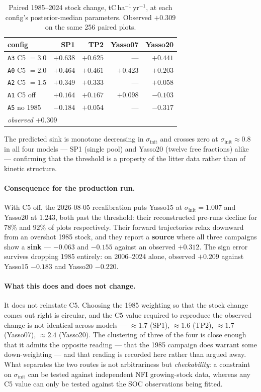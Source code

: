 \documentclass[11pt]{article}
\newcommand{\sinit}{\sigma_{\mathrm{init}}}
\begin{document}
\begin{table}[H]\centering\small
\caption{Paired 1985--2024 stock change, tC\,ha$^{-1}$\,yr$^{-1}$, at each config's
posterior-median parameters. Observed $+0.309$ on the same 256 paired plots.}
\begin{tabular}{lrrrr}
\toprule
config & SP1 & TP2 & Yasso07 & Yasso20\\
\midrule
\texttt{A3} C5 $=3.0$   & $+0.638$ & $+0.625$ & ---      & $+0.441$\\
\texttt{A0} C5 $=2.0$   & $+0.464$ & $+0.461$ & $+0.423$ & $+0.203$\\
\texttt{A2} C5 $=1.5$   & $+0.349$ & $+0.333$ & ---      & $+0.058$\\
\texttt{A1} C5 off      & $+0.164$ & $+0.167$ & $+0.098$ & $\mathbf{-0.103}$\\
\texttt{A5} no 1985     & $\mathbf{-0.184}$ & $+0.054$ & --- & $\mathbf{-0.317}$\\
\midrule
\multicolumn{5}{l}{\emph{observed} $+0.309$}\\
\bottomrule
\end{tabular}
\end{table}

\noindent The predicted sink is monotone decreasing in $\sinit$ and crosses zero at
$\sinit \approx 0.8$ in all four models --- SP1 (single pool) and Yasso20 (twelve free
fractions) alike --- confirming that the threshold is a property of the litter data rather than
of kinetic structure.

\paragraph{Consequence for the production run.} With C5 off, the 2026-08-05 recalibration puts
Yasso15 at $\sinit = 1.007$ and Yasso20 at $1.243$, both past the threshold: their reconstructed
pre-runs decline for $78\%$ and $92\%$ of plots respectively. Their forward trajectories relax
downward from an overshot 1985 stock, and they report a \textbf{source} where all three
campaigns show a \textbf{sink} --- $-0.063$ and $-0.155$ against an observed $+0.312$. The sign
error survives dropping 1985 entirely: on 2006--2024 alone, observed $+0.209$ against Yasso15
$-0.183$ and Yasso20 $-0.220$.

\paragraph{What this does and does not change.} It does not reinstate C5. Choosing the 1985
weighting so that the stock change comes out right is circular, and the C5 value required to
reproduce the observed change is not identical across models --- $\approx 1.7$ (SP1),
$\approx 1.6$ (TP2), $\approx 1.7$ (Yasso07), $\approx 2.4$ (Yasso20). The clustering of three
of the four is close enough that it admits the opposite reading --- that the 1985 campaign does
warrant some down-weighting --- and that reading is recorded here rather than argued away. What
separates the two routes is not arbitrariness but \emph{checkability}: a constraint on $\sinit$
can be tested against independent NFI growing-stock data, whereas any C5 value can only be
tested against the SOC observations being fitted.
\end{document}
